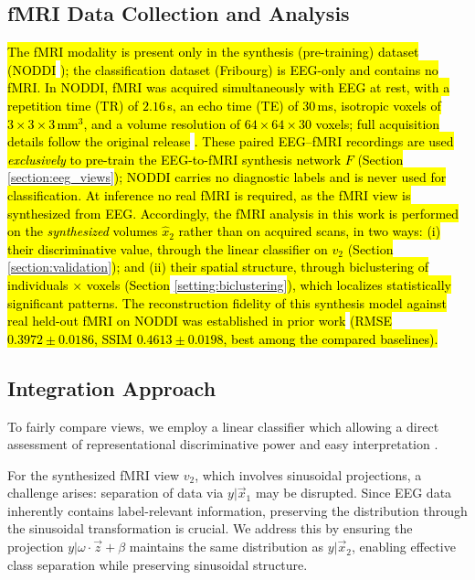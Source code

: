\documentclass{article}
\begin{document}
\subsection{fMRI Data Collection and Analysis} 

\hl{The fMRI modality is present only in the synthesis (pre-training) dataset (NODDI }\cite{dataset_01}\hl{); the classification dataset (Fribourg) is EEG-only and contains no fMRI. In NODDI, fMRI was acquired simultaneously with EEG at rest, with a repetition time (TR) of $2.16$\,s, an echo time (TE) of $30$\,ms, isotropic voxels of $3 \times 3 \times 3$\,mm$^3$, and a volume resolution of $64 \times 64 \times 30$ voxels; full acquisition details follow the original release }\cite{dataset_01}\hl{. These paired EEG--fMRI recordings are used \emph{exclusively} to pre-train the EEG-to-fMRI synthesis network $F$ (Section }\ref{section:eeg_views}\hl{); NODDI carries no diagnostic labels and is never used for classification. At inference no real fMRI is required, as the fMRI view is synthesized from EEG. Accordingly, the fMRI analysis in this work is performed on the \emph{synthesized} volumes $\hat{x}_2$ rather than on acquired scans, in two ways: (i) their discriminative value, through the linear classifier on $v_2$ (Section }\ref{section:validation}\hl{); and (ii) their spatial structure, through biclustering of individuals $\times$ voxels (Section }\ref{setting:biclustering}\hl{), which localizes statistically significant patterns. The reconstruction fidelity of this synthesis model against real held-out fMRI on NODDI was established in prior work }\cite{calhas2022eeg}\hl{ (RMSE $0.3972 \pm 0.0186$, SSIM $0.4613 \pm 0.0198$, best among the compared baselines).}

\subsection{Integration Approach}\label{section:integration}

To fairly compare views, we employ a linear classifier which allowing a direct assessment of representational discriminative power and easy interpretation \cite{treviso2020explanation}.

For the synthesized fMRI view $v_2$, which involves sinusoidal projections, a challenge arises: separation of data via $y|\vec{x}_1$ may be disrupted. Since EEG data inherently contains label-relevant information, preserving the distribution through the sinusoidal transformation is crucial. We address this by ensuring the projection $y|\omega \cdot \vec{z} + \beta$ maintains the same distribution as $y|\vec{x}_2$, enabling effective class separation while preserving sinusoidal structure.
\end{document}
